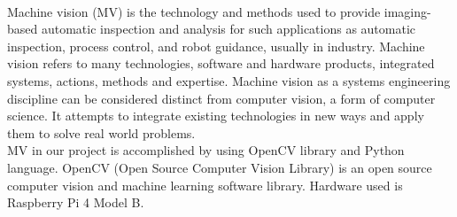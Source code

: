 \paragraph{}Machine vision (MV) is the technology and methods used to provide imaging-based automatic inspection and analysis for such applications as automatic inspection, process control, and robot guidance, usually in industry. Machine vision refers to many technologies, software and hardware products, integrated systems, actions, methods and expertise. Machine vision as a systems engineering discipline can be considered distinct from computer vision, a form of computer science. It attempts to integrate existing technologies in new ways and apply them to solve real world problems.\\

MV in our project is accomplished by using OpenCV library and Python language. OpenCV (Open Source Computer Vision Library) is an open source computer vision and machine learning software library. Hardware used is Raspberry Pi 4 Model B.\\

